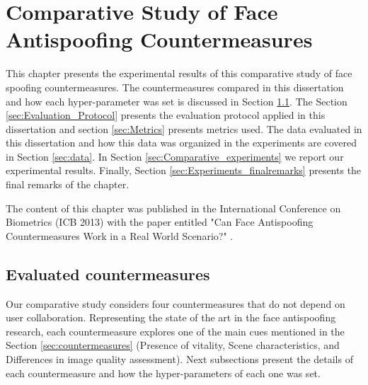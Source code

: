 \chapter{Comparative Study of Face Antispoofing Countermeasures}
\label{chap:Comparative_Study}

This chapter presents the experimental results of this comparative study of face spoofing countermeasures. The countermeasures compared in this dissertation and how each hyper-parameter was set is discussed in Section \ref{sec:Evaluated_countermeasures}. The Section \ref{sec:Evaluation_Protocol} presents the evaluation protocol applied in this dissertation and section \ref{sec:Metrics} presents metrics used. The data evaluated in this dissertation and how this data was organized in the experiments are covered in Section \ref{sec:data}. In Section \ref{sec:Comparative_experiments} we report our experimental results. Finally, Section \ref{sec:Experiments_finalremarks} presents the final remarks of the chapter.

The content of this chapter was published in the International Conference on Biometrics (ICB 2013) with the paper entitled "Can Face Antispoofing Countermeasures Work in a Real World Scenario?" \cite{FreitasPereira_ICB_2013}.



\section{Evaluated countermeasures}
\label{sec:Evaluated_countermeasures}

Our comparative study considers four countermeasures that do not depend on user collaboration. Representing the state of the art in the face antispoofing research, each countermeasure explores one of the main cues mentioned in the Section \ref{sec:countermeasures} (Presence of vitality, Scene characteristics, and Differences in image quality assessment). Next subsections present the details of each countermeasure and how the hyper-parameters of each one was set.


